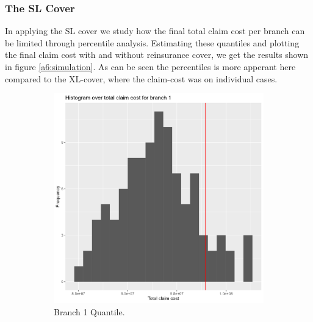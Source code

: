 \documentclass[11pt]{article}
\begin{document}
\subsubsection*{The SL Cover}

In applying the SL cover we study how the final total claim cost per branch can be limited through percentile analysis.
Estimating these quantiles and plotting the final claim cost with and without reinsurance cover, we get the results shown in figure \ref{a6:simulation}.
As can be seen the percentiles is more apperant here compared to the XL-cover, where the claim-cost was on individual cases.

 \begin{figure}[!h]
\centering
    \begin{subfigure}{.24\textwidth}
      \centering
      \includegraphics[width=.9\linewidth]{plots/reinsurance2/histogram_over_90p_quantile_1.png}
      \caption{Branch 1 Quantile.}
    \end{subfigure}
    \begin{subfigure}{.24\textwidth}
      \centering

\end{subfigure}
\end{figure}
\end{document}
